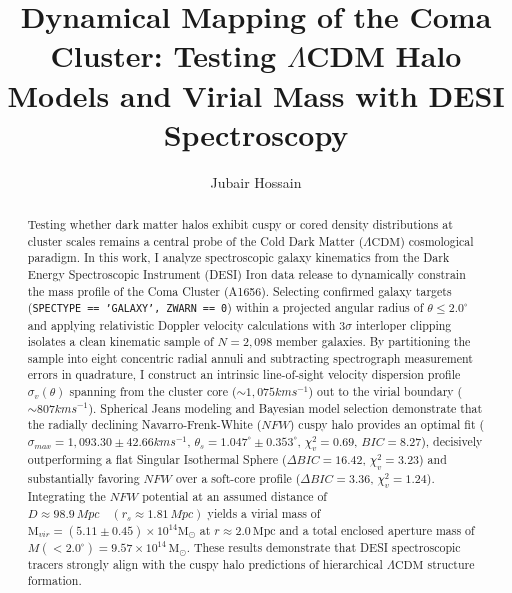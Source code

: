 \documentclass[twocolumn]{aastex631}
\begin{document}
\title{Dynamical Mapping of the Coma Cluster: Testing $\Lambda$CDM Halo Models and Virial Mass with DESI Spectroscopy}


\author{Jubair Hossain}

\begin{abstract}
	Testing whether dark matter halos exhibit cuspy or cored density distributions at cluster scales remains a central probe of the Cold Dark Matter ($\Lambda \text{CDM}$) cosmological paradigm. In this work, I analyze spectroscopic galaxy kinematics from the Dark Energy Spectroscopic Instrument (DESI) Iron data release to dynamically constrain the mass profile of the Coma Cluster (A1656). Selecting confirmed galaxy targets (\texttt{SPECTYPE == 'GALAXY', ZWARN == 0}) within a projected angular radius of $\theta \leq 2.0^{\circ}$ and applying relativistic Doppler velocity calculations with $3\sigma$ interloper clipping isolates a clean kinematic sample of $N = 2,098$ member galaxies. By partitioning the sample into eight concentric radial annuli and subtracting spectrograph measurement errors in quadrature, I construct an intrinsic line-of-sight velocity dispersion profile $\sigma_{v}(\theta)$ spanning from the cluster core ($\sim 1,075 kms^{-1}$) out to the virial boundary ($\sim807km s^{-1}$). Spherical Jeans modeling and Bayesian model selection demonstrate that the radially declining Navarro-Frenk-White ($NFW$) cuspy halo provides an optimal fit ($\sigma_{max} = 1,093.30 \pm 42.66 kms^{-1}$, $\theta_{s} = 1.047^{\circ} \pm 0.353^{\circ}$, $\chi_{v}^{2} = 0.69$, $BIC = 8.27$), decisively outperforming a flat Singular Isothermal Sphere ($\Delta BIC = 16.42$, $\chi_{v}^{2} = 3.23$) and substantially favoring $NFW$ over a soft-core profile ($\Delta BIC = 3.36$, $\chi_{v}^{2} = 1.24$). Integrating the $NFW$ potential at an assumed distance of $D \approx 98.9 \,Mpc \quad(r_{s} \approx 1.81 \,Mpc)$ yields a virial mass of $\text{M}_{vir} = (5.11 \pm 0.45) \times 10^{14} \mathrm{M}_{\odot}$ at $r \approx 2.0 \,\text{Mpc}$ and a total enclosed aperture mass of $M(<2.0^\circ) = 9.57 \times 10^{14}\,\mathrm{M}_\odot$. These results demonstrate that DESI spectroscopic tracers strongly align with the cuspy halo predictions of hierarchical $\Lambda\text{CDM}$ structure formation.

\end{abstract}
\end{document}
